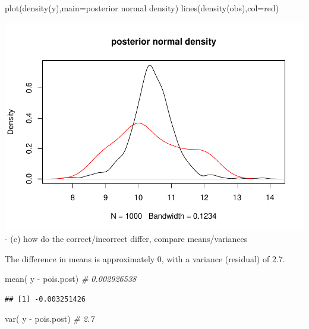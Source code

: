 \documentclass[
]{book}
\newenvironment{Shaded}{\begin{snugshade}}{\end{snugshade}}
\newcommand{\AttributeTok}[1]{\textcolor[rgb]{0.77,0.63,0.00}{#1}}
\newcommand{\CommentTok}[1]{\textcolor[rgb]{0.56,0.35,0.01}{\textit{#1}}}
\newcommand{\FunctionTok}[1]{\textcolor[rgb]{0.00,0.00,0.00}{#1}}
\newcommand{\NormalTok}[1]{#1}
\newcommand{\SpecialCharTok}[1]{\textcolor[rgb]{0.00,0.00,0.00}{#1}}
\newcommand{\StringTok}[1]{\textcolor[rgb]{0.31,0.60,0.02}{#1}}
\theoremstyle{definition}
\theoremstyle{definition}
\theoremstyle{definition}
\theoremstyle{definition}
\theoremstyle{remark}
\begin{document}
\begin{Shaded}
\begin{Highlighting}[]
  \FunctionTok{plot}\NormalTok{(}\FunctionTok{density}\NormalTok{(y),}\AttributeTok{main=}\StringTok{\textquotesingle{}posterior normal density\textquotesingle{}}\NormalTok{)}
  \FunctionTok{lines}\NormalTok{(}\FunctionTok{density}\NormalTok{(obs),}\AttributeTok{col=}\StringTok{\textquotesingle{}red\textquotesingle{}}\NormalTok{)}
\end{Highlighting}
\end{Shaded}

\includegraphics{_main_files/figure-latex/unnamed-chunk-40-2.pdf}
- (c) how do the correct/incorrect differ, compare means/variances

The difference in means is approximately 0, with a variance (residual) of 2.7.

\begin{Shaded}
\begin{Highlighting}[]
 \FunctionTok{mean}\NormalTok{( y }\SpecialCharTok{{-}}\NormalTok{ pois.post) }\CommentTok{\# 0.002926538}
\end{Highlighting}
\end{Shaded}

\begin{verbatim}
## [1] -0.003251426
\end{verbatim}

\begin{Shaded}
\begin{Highlighting}[]
 \FunctionTok{var}\NormalTok{( y }\SpecialCharTok{{-}}\NormalTok{ pois.post) }\CommentTok{\# 2.7}
\end{Highlighting}
\end{Shaded}
\end{document}

